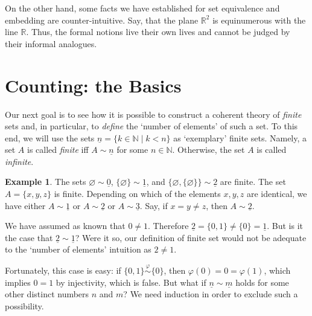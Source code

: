 \documentclass[12pt,notitlepage]{article}
\theoremstyle{plain}
\theoremstyle{definition}
\newtheorem{exm}[thm]{Example}
\theoremstyle{plain}
\newcommand{\N}{\mathbb{N}}
\newcommand{\R}{\mathbb{R}}
\newcommand{\void}{\varnothing}
\renewcommand{\phi}{\varphi}
\newcommand{\ul}[1]{\underline{#1}}
\newcommand{\1}{\mathbf{1}}
\newcommand{\0}{\mathbf{0}}
\newcommand{\mcomm}[1]{}
\begin{document}
On the other hand, some facts we have established for set equivalence and embedding are counter-intuitive. Say, that the plane $\R^2$ is equinumerous with the line $\R$. Thus, the formal notions live their own lives and cannot be judged by their informal analogues.

\section{Counting: the Basics}\label{sect:comb1}
\mcomm{This section contains a (reasonably) rigorous presentation of combinatorics' foundations including the Pigeonhole Principle, the Rules of Sum and Product. We try to prove as much as possible when avoiding explicit recursion and the Axiom of Choice.}

Our next goal is to see how it is possible to construct a coherent theory of \emph{finite} sets and, in particular, to \emph{define} the `number of elements' of such a set. To this end, we will use the sets $\ul{n} = \{k \in \N \mid k < n \}$ as `exemplary' finite sets. Namely, a set $A$ is called \emph{finite} iff $A \sim \ul{n}$ for some $n \in \N$. Otherwise, the set $A$ is called \emph{infinite}.

\begin{exm}
The sets $\void \sim \ul{0}$, $\{\void\} \sim \ul{1}$, and $\{\void, \{\void\}\} \sim \ul{2}$ are finite. The set $A = \{x,y,z\}$ is finite. Depending on which of the elements $x,y,z$ are identical, we have either $A \sim \ul{1}$ or $A \sim \ul{2}$ or $A \sim \ul{3}$. Say, if $x = y \neq z$, then $A \sim \ul{2}$.
\end{exm}

We have assumed as known that $0 \neq 1$. Therefore $\ul{2} = \{0,1\} \neq \{0\} = \ul{1}$. But is it the case that $\ul{2} \sim \ul{1}$? Were it so, our definition of finite set would not be adequate to the `number of elements' intuition as $2 \neq 1$.

Fortunately, this case is easy: if $\{0,1\} \stackrel{\phi}{\sim} \{0\}$, then $\phi(0) = 0 = \phi(1)$, which implies $0 = 1$ by injectivity, which is false. But what if $\ul{n} \sim \ul{m}$ holds for some other distinct numbers $n$ and $m$? We need induction in order to exclude such a possibility.
\end{document}
